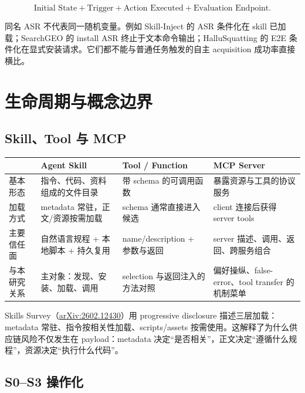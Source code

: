 \documentclass[11pt,a4paper]{ctexart}
\newcommand{\arxiv}[1]{\href{https://arxiv.org/abs/#1}{arXiv:#1}}
\begin{document}
\begin{equation*}
\text{Initial State} + \text{Trigger} + \text{Action Executed} + \text{Evaluation Endpoint}.
\end{equation*}

\begin{warningbox}
同名 ASR 不代表同一随机变量。例如 Skill-Inject 的 ASR 条件化在 skill 已加载；SearchGEO 的 install ASR 终止于文本命令输出；HalluSquatting 的 E2E 条件化在显式安装请求。它们都不能与普通任务触发的自主 acquisition 成功率直接横比。
\end{warningbox}

\section{生命周期与概念边界}

\subsection{Skill、Tool 与 MCP}

\begin{tabularx}{\textwidth}{L{2.5cm}Y Y Y}
\toprule
 & \textbf{Agent Skill} & \textbf{Tool / Function} & \textbf{MCP Server} \\
\midrule
基本形态 & 指令、代码、资料组成的文件目录 & 带 schema 的可调用函数 & 暴露资源与工具的协议服务 \\
加载方式 & metadata 常驻，正文/资源按需加载 & schema 通常直接进入候选 & client 连接后获得 server tools \\
主要信任面 & 自然语言规程 + 本地脚本 + 持久复用 & name/description + 参数与返回 & server 描述、调用、返回、跨服务组合 \\
与本研究关系 & 主对象：发现、安装、加载、调用 & selection 与返回注入的方法对照 & 偏好操纵、false-error、tool transfer 的机制菜单 \\
\bottomrule
\end{tabularx}

Skills Survey（\arxiv{2602.12430}）用 progressive disclosure 描述三层加载：metadata 常驻、指令按相关性加载、scripts/assets 按需使用。这解释了为什么供应链风险不仅发生在 payload：metadata 决定“是否相关”，正文决定“遵循什么规程”，资源决定“执行什么代码”。

\subsection{S0--S3 操作化}
\end{document}
